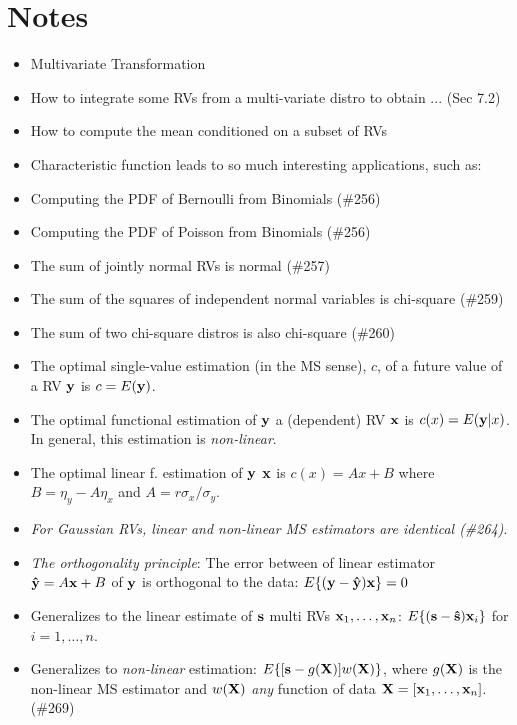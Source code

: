 \documentclass[a4paper, oneside]{book}
\begin{document}
\section{Notes}
\begin{itemize}
\item Multivariate Transformation
\item How to integrate some RVs from a multi-variate distro to obtain ... (Sec 7.2)
\item How to compute the mean conditioned on a subset of RVs
\item Characteristic function leads to so much interesting applications, such as:
	\item Computing the PDF of Bernoulli from Binomials (\#256)
	\item Computing the PDF of Poisson from Binomials (\#256)
	\item The sum of jointly normal RVs is normal (\#257)
	\item The sum of the squares of independent normal variables is chi-square (\#259)
	\item The sum of two chi-square distros is also chi-square (\#260)
\item The optimal single-value estimation (in the MS sense), $c$, of a future value of a RV $\mathbf{y}$ is $c=E(\mathbf{y})$.
\item The optimal functional estimation of $\mathbf{y}$ \ito a (dependent) RV $\mathbf{x}$ is $c(x)=E(\mathbf{y}|x)$. In general, this estimation is \textit{non-linear}.
\item The optimal linear f. estimation of $\mathbf{y}$ \ito $\mathbf{x}$ is $c(x) = Ax + B$ where $B = \eta_y - A\eta_x$ and $A = r \sigma_x/\sigma_y$. 
\item \textit{For Gaussian RVs, linear and non-linear MS estimators are identical (\#264)}.
\item \textit{The orthogonality principle}: The error between of linear estimator $\mathbf{\hat{y}}=A\mathbf{x}+B$ of $\mathbf{y}$ is orthogonal to the data: $E\{(\mathbf{y}-\mathbf{\hat{y}})\mathbf{x}\}=0$
	\item Generalizes to the linear estimate of $\mathbf{s}$ \ito multi RVs $\mathbf{x}_1, \hdots, \mathbf{x}_n$: $E\{(\mathbf{s}-\mathbf{\hat{s}})\mathbf{x}_i\}$ for $i=1,\hdots,n$.
	\item Generalizes to \textit{non-linear} estimation: $E\{[\mathbf{s}-g(\mathbf{X})]w(\mathbf{X})\}$, where $g(\mathbf{X})$ is the non-linear MS estimator and $w(\mathbf{X})$ \textit{any} function of data $\mathbf{X}=[\mathbf{x}_1,\hdots,\mathbf{x}_n]$. (\#269)

\end{itemize}
\end{document}
